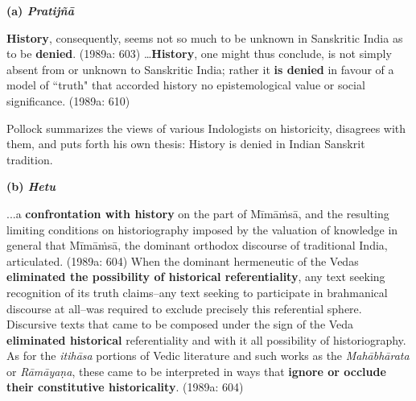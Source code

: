 \textbf{(a) \textit{Pratijñā}}

\begin{myquote}
\textbf{History}, consequently, seems not so much to be unknown in Sanskritic India as to be \textbf{denied}. (1989a: 603) …\textbf{History}, one might thus conclude, is not simply absent from or unknown to Sanskritic India; rather it \textbf{is denied} in favour of a model of ``truth" that accorded history no epistemological value or social significance. (1989a: 610)
\end{myquote}

Pollock summarizes the views of various Indologists on historicity, disagrees with them, and puts forth his own thesis: History is denied in Indian Sanskrit tradition.

\textbf{(b) \textit{Hetu}}

\begin{myquote}
...a \textbf{confrontation with history} on the part of Mīmāṁsā, and the resulting limiting conditions on historiography imposed by the valuation of knowledge in general that Mīmāṁsā, the dominant orthodox discourse of traditional India, articulated. (1989a: 604) When the dominant hermeneutic of the Vedas \textbf{eliminated the possibility of historical referentiality}, any text seeking recognition of its truth claims–any text seeking to participate in brahmanical discourse at all–was required to exclude precisely this referential sphere. Discursive texts that came to be composed under the sign of the Veda \textbf{eliminated historical} referentiality and with it all possibility of historiography. As for the \textit{itihāsa} portions of Vedic literature and such works as the \textit{Mahābhārata} or \textit{Rāmāyaṇa}, these came to be interpreted in ways that \textbf{ignore or occlude their constitutive historicality}. (1989a: 604)
\end{myquote}

